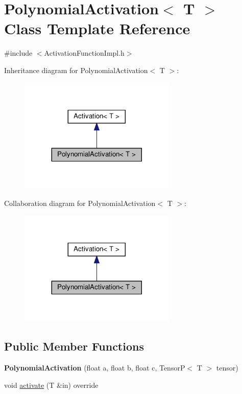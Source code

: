 \hypertarget{classPolynomialActivation}{}\section{Polynomial\+Activation$<$ T $>$ Class Template Reference}
\label{classPolynomialActivation}


{\ttfamily \#include $<$Activation\+Function\+Impl.\+h$>$}



Inheritance diagram for Polynomial\+Activation$<$ T $>$\+:
\nopagebreak
\begin{figure}[H]
\begin{center}
\leavevmode
\includegraphics[width=212pt]{classPolynomialActivation__inherit__graph}
\end{center}
\end{figure}


Collaboration diagram for Polynomial\+Activation$<$ T $>$\+:
\nopagebreak
\begin{figure}[H]
\begin{center}
\leavevmode
\includegraphics[width=212pt]{classPolynomialActivation__coll__graph}
\end{center}
\end{figure}
\subsection*{Public Member Functions}
\begin{DoxyCompactItemize}
\item 
\mbox{\label{classPolynomialActivation_a6fffe5767ff2ba325e2c9765769cbc54}} 
{\bfseries Polynomial\+Activation} (float a, float b, float c, TensorP$<$ T $>$ tensor)
\item 
void \hyperlink{classPolynomialActivation_ac245cf706f30922e33700ca58de7c21d}{activate} (T \&in) override
\end{DoxyCompactItemize}
